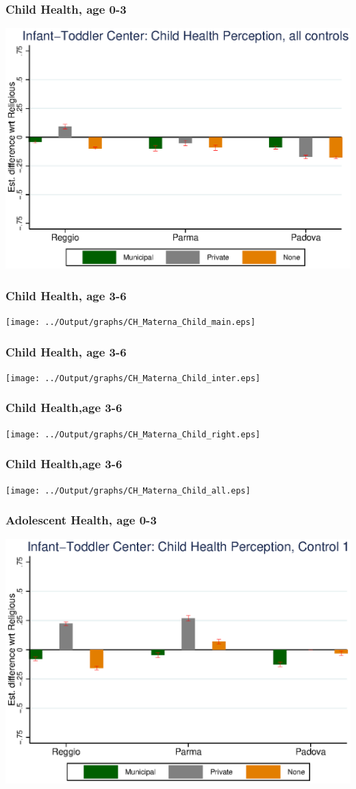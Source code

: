\documentclass{beamer}
\begin{document}
\begin{frame}\frametitle{Child Health, age 0-3}
\center
\includegraphics[scale=0.7]{../Output/graphs/CH_Asilo_Child_all.eps}
\end{frame}


\begin{frame}\frametitle{Child Health, age 3-6}
\center
\texttt{[image: ../Output/graphs/CH\_Materna\_Child\_main.eps]}
\end{frame}

\begin{frame}\frametitle{Child Health, age 3-6}
\center
\texttt{[image: ../Output/graphs/CH\_Materna\_Child\_inter.eps]}
\end{frame}

\begin{frame}\frametitle{Child Health,age 3-6}
\center
\texttt{[image: ../Output/graphs/CH\_Materna\_Child\_right.eps]}
\end{frame}

\begin{frame}\frametitle{Child Health,age 3-6}
\center
\texttt{[image: ../Output/graphs/CH\_Materna\_Child\_all.eps]}
\end{frame}

\begin{frame}\frametitle{Adolescent Health, age 0-3}
\center
\includegraphics[scale=0.7]{../Output/graphs/CH_Asilo_Adol_main.eps}
\end{frame}
\end{document}
